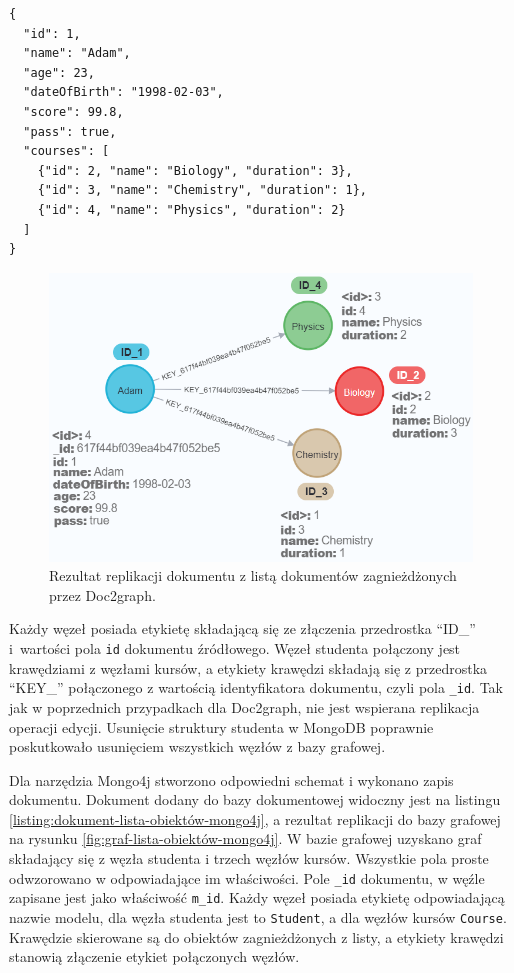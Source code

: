 \documentclass[a4paper,twoside,12pt]{book}
\begin{document}
\begin{lstlisting}[style=JSON2, caption={Struktura dokumentu z listą dokumentów zagnieżdżonych dla Doc2graph.}, label={listing:json-lista-obiektów-doc2graph}, captionpos=b]
{
  "id": 1,
  "name": "Adam",
  "age": 23,
  "dateOfBirth": "1998-02-03",
  "score": 99.8,	
  "pass": true,
  "courses": [
    {"id": 2, "name": "Biology", "duration": 3},
    {"id": 3, "name": "Chemistry", "duration": 1},
    {"id": 4, "name": "Physics", "duration": 2}
  ]
}
\end{lstlisting}

\begin{figure}
\centering
\includegraphics[width=12cm]{images/lista_obiektów_doc2graph.png}
\caption{Rezultat replikacji dokumentu z listą dokumentów zagnieżdżonych przez Doc2graph.}
\label{fig:graf-lista-obiektów-doc2graph}
\end{figure}

\vspace{0.1cm}

Każdy węzeł posiada etykietę składającą się ze złączenia przedrostka ``ID\_'' i~wartości pola \texttt{id} dokumentu źródłowego. Węzeł studenta połączony jest krawędziami z węzłami kursów, a etykiety krawędzi składają się z przedrostka ``KEY\_'' połączonego z wartością identyfikatora dokumentu, czyli pola \texttt{\_id}. Tak jak w poprzednich przypadkach dla Doc2graph, nie jest wspierana replikacja operacji edycji. Usunięcie struktury studenta w MongoDB poprawnie poskutkowało usunięciem wszystkich węzłów z bazy grafowej. 

\vspace{0.1cm}

Dla narzędzia Mongo4j stworzono odpowiedni schemat i wykonano zapis dokumentu. Dokument dodany do bazy dokumentowej widoczny jest na listingu \ref{listing:dokument-lista-obiektów-mongo4j}, a rezultat replikacji do bazy grafowej na rysunku \ref{fig:graf-lista-obiektów-mongo4j}. W bazie grafowej uzyskano graf składający się z węzła studenta i trzech węzłów kursów. Wszystkie pola proste odwzorowano w odpowiadające im właściwości. Pole \texttt{\_id} dokumentu, w węźle zapisane jest jako właściwość \texttt{m\_id}. Każdy węzeł posiada etykietę odpowiadającą nazwie modelu, dla węzła studenta jest to \texttt{Student}, a dla węzłów kursów \texttt{Course}. Krawędzie skierowane są do obiektów zagnieżdżonych z listy, a etykiety krawędzi stanowią złączenie etykiet połączonych węzłów.
\end{document}
